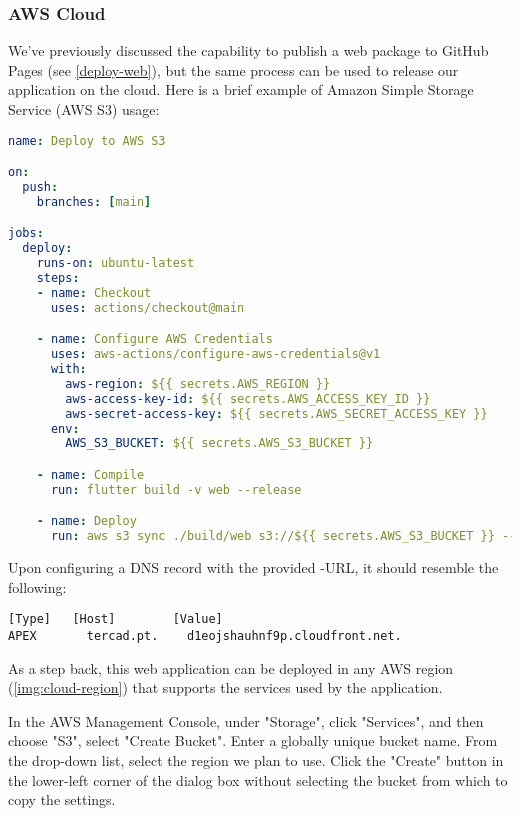 
\subsubsection{AWS Cloud}

We've previously discussed the capability to publish a web package to GitHub Pages (see \ref{deploy-web}), but the same process can be used to release our application on the cloud. Here is a brief example of Amazon Simple Storage Service (AWS S3) usage:

\begin{lstlisting}[language=yaml]
name: Deploy to AWS S3

on: 
  push:
    branches: [main]

jobs:
  deploy:
    runs-on: ubuntu-latest
    steps:
    - name: Checkout
      uses: actions/checkout@main

    - name: Configure AWS Credentials
      uses: aws-actions/configure-aws-credentials@v1
      with:
        aws-region: ${{ secrets.AWS_REGION }}
        aws-access-key-id: ${{ secrets.AWS_ACCESS_KEY_ID }}
        aws-secret-access-key: ${{ secrets.AWS_SECRET_ACCESS_KEY }}
      env:
        AWS_S3_BUCKET: ${{ secrets.AWS_S3_BUCKET }}

    - name: Compile
      run: flutter build -v web --release

    - name: Deploy
      run: aws s3 sync ./build/web s3://${{ secrets.AWS_S3_BUCKET }} --delete
\end{lstlisting}

\noindent Upon configuring a DNS record with the provided -URL, it should resemble the following:

\begin{lstlisting}[language=terminal]
[Type]	 [Host]        [Value]
APEX	   tercad.pt.    d1eojshauhnf9p.cloudfront.net.
\end{lstlisting}

\noindent As a step back, this web application can be deployed in any AWS region (\cref{img:cloud-region}) that supports 
the services used by the application.


\noindent In the AWS Management Console, under "Storage", click "Services", and then choose "S3", select "Create Bucket".
Enter a globally unique bucket name. From the drop-down list, select the region we plan to use. Click the "Create" 
button in the lower-left corner of the dialog box without selecting the bucket from which to copy the settings.

